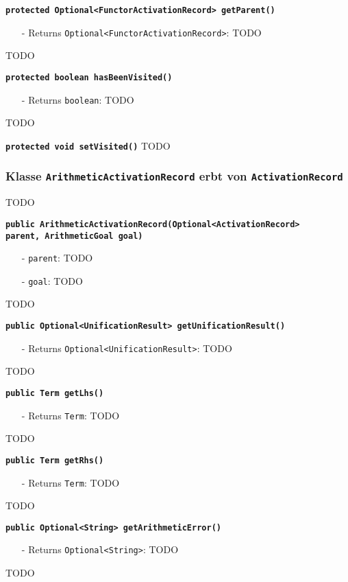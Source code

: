 \documentclass[parskip=full,11pt,twoside]{scrartcl}
\begin{document}
\textbf{\texttt{protected Optional<FunctorActivationRecord> getParent()}}
\begin{itemize}[noitemsep]
	\item[-] Returns \texttt{Optional<FunctorActivationRecord>}: TODO
\end{itemize}
TODO

\textbf{\texttt{protected boolean hasBeenVisited()}}
\begin{itemize}[noitemsep]
	\item[-] Returns \texttt{boolean}: TODO
\end{itemize}
TODO

\textbf{\texttt{protected void setVisited()}}
TODO

\subsubsection{Klasse \texttt{ArithmeticActivationRecord} erbt von \texttt{ActivationRecord}}
TODO

\textbf{\texttt{public ArithmeticActivationRecord(Optional<ActivationRecord>\\parent, ArithmeticGoal goal)}}
\begin{itemize}[noitemsep]
	\item[-] \texttt{parent}: TODO
	\item[-] \texttt{goal}: TODO
\end{itemize}
TODO

\textbf{\texttt{public Optional<UnificationResult> getUnificationResult()}}
\begin{itemize}[noitemsep]
	\item[-] Returns \texttt{Optional<UnificationResult>}: TODO
\end{itemize}
TODO

\textbf{\texttt{public Term getLhs()}}
\begin{itemize}[noitemsep]
	\item[-] Returns \texttt{Term}: TODO
\end{itemize}
TODO

\textbf{\texttt{public Term getRhs()}}
\begin{itemize}[noitemsep]
	\item[-] Returns \texttt{Term}: TODO
\end{itemize}
TODO

\textbf{\texttt{public Optional<String> getArithmeticError()}}
\begin{itemize}[noitemsep]
	\item[-] Returns \texttt{Optional<String>}: TODO
\end{itemize}
TODO
\end{document}
